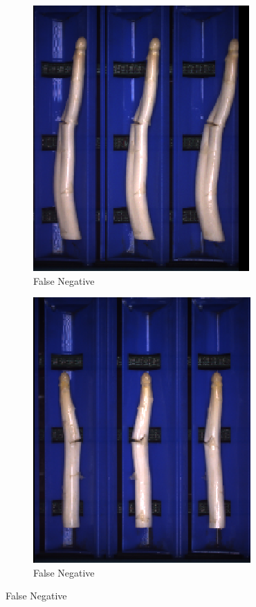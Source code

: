 \begin{figure}[!htb]
\begin{subfigure}{0.3\textwidth}
		\includegraphics[width=0.9\linewidth]{Figures/appendix/violet_falsenegative_02.png}
		\vspace{-5pt}
		\caption{False Negative}
	\end{subfigure}
	\begin{subfigure}{0.3\textwidth}
		\includegraphics[width=0.9\linewidth]{Figures/appendix/violet_falsenegative_03.png}
		\vspace{-5pt}
		\caption{False Negative}
	\end{subfigure}


\end{figure}
